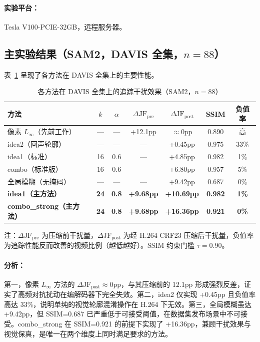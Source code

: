 \documentclass[UTF8,a4paper,12pt]{ctexart}
\begin{document}
\paragraph{实验平台：} Tesla V100-PCIE-32GB，远程服务器。

\subsection{主实验结果（SAM2，DAVIS 全集，$n=88$）}

表~\ref{tab:main} 呈现了各方法在 DAVIS 全集上的主要性能。

\begin{table}[H]
\centering
\caption{各方法在 DAVIS 全集上的追踪干扰效果（SAM2，$n=88$）}
\label{tab:main}
\begin{tabular}{lcccccc}
\toprule
方法 & $k$ & $\alpha$ & $\Delta\text{JF}_{\text{pre}}$ & $\Delta\text{JF}_{\text{post}}$ & SSIM & 负值率 \\
\midrule
像素 $L_\infty$（先前工作） & — & — & +12.1pp & $\approx$0pp & 0.890 & 高 \\
idea2（回声轮廓） & — & — & — & +0.45pp & 0.975 & 33\% \\
idea1（标准） & 16 & 0.6 & — & +4.85pp & 0.982 & 1\% \\
combo（标准版） & 16 & 0.6 & — & +6.80pp & 0.957 & 5\% \\
全局模糊（无掩码） & — & — & — & +9.42pp & 0.687 & 0\% \\
\midrule
\textbf{idea1（主方法）} & \textbf{24} & \textbf{0.8} & \textbf{+9.68pp} & \textbf{+10.69pp} & \textbf{0.982} & \textbf{1\%} \\
\textbf{combo\_strong（主方法）} & \textbf{24} & \textbf{0.8} & \textbf{+9.68pp} & \textbf{+16.36pp} & \textbf{0.921} & \textbf{0\%} \\
\bottomrule
\end{tabular}
\smallskip

\small 注：$\Delta\text{JF}_{\text{pre}}$ 为压缩前干扰量，$\Delta\text{JF}_{\text{post}}$ 为经 H.264 CRF23 压缩后干扰量，负值率为追踪性能反而改善的视频比例（越低越好）。SSIM 约束门槛 $\tau = 0.90$。
\end{table}

\paragraph{分析：}第一，像素 $L_\infty$ 方法的 $\Delta\text{JF}_{\text{post}} \approx 0\text{pp}$，与其压缩前的 12.1pp 形成强烈反差，证实了高频对抗扰动在编解码器下完全失效。第二，idea2 仅实现 +0.45pp 且负值率高达 33\%，说明单纯的视觉轮廓混淆操作在 H.264 下无效。第三，全局模糊虽达 +9.42pp，但 SSIM=0.687 已严重低于可接受阈值，在数据集发布场景中不可接受。combo\_strong 在 SSIM=0.921 的前提下实现了 +16.36pp，兼顾干扰效果与视觉保真，是唯一在两个维度上同时满足要求的方法。
\end{document}
